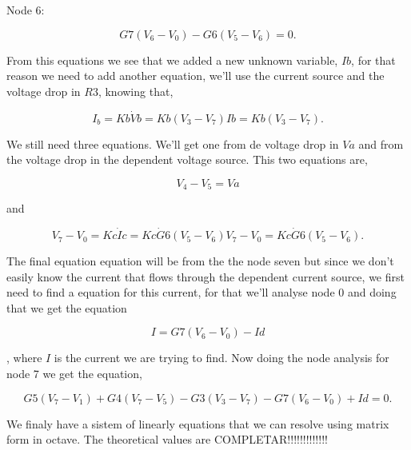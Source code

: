 Node 6:

 \begin{equation}
  G7(V_6-V_0)-G6(V_5-V_6) = 0.
  \label{eq:N6}
\end{equation}

From this equations we see that we added a new unknown variable, $Ib$, for that reason we need to add another equation, we'll use the current source and the voltage drop in $R3$, knowing that,

 \begin{equation}
  I_b = Kb \dot Vb = Kb(V_3-V_7) Ib = Kb(V_3-V_7).
  \label{eq:Ib}
\end{equation}

We still need three equations. We'll get one from de voltage drop in $Va$ and from the voltage drop in the dependent voltage source. This two equations are,

  \begin{equation}
  V_4-V_5 = Va
  \label{eq:Va}
\end{equation}

and

 \begin{equation}
  V_7-V_0 = Kc \dot Ic = Kc\dot G6(V_5-V_6) V_7-V_0 = Kc\dot G6(V_5-V_6).
  \label{eq:Vc}
\end{equation}

The final equation equation will be from the the node seven but since we don't easily know the current that flows through the dependent current source, we first need to find a equation for this current, for that we'll analyse node 0 and doing that we get the equation

 \begin{equation}
  I = G7(V_6-V_0) - Id
  \label{eq:corrente}
\end{equation}

, where $I$ is the current we are trying to find. Now doing the node analysis for node 7 we get the equation,

 \begin{equation}
  G5(V_7-V_1)+G4(V_7-V_5)-G3(V_3-V_7)-G7(V_6-V_0)+Id = 0.
  \label{eq:N3}
\end{equation}

We finaly have a sistem of linearly equations that we can resolve using matrix form in octave.
The theoretical values are COMPLETAR!!!!!!!!!!!!!
